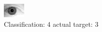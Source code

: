 \begin{figure}[h!]
\begin{center}
\includegraphics[width=0.60\columnwidth]{figures/ID2198_class_4_target_3.png}
\end{center}
\caption{ Classification: 4 actual target: 3}
\label{fig:ID2198_class_4_target_3}
\end{figure}
